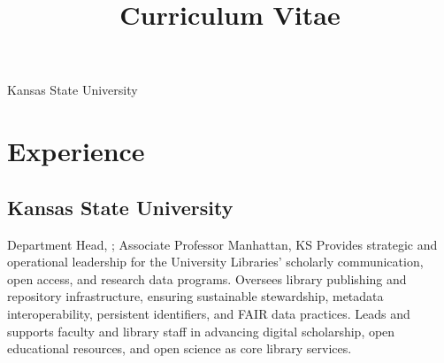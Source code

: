 


\title{Curriculum Vitae}
\address{University Library}{Kansas State University}








\portfoliotitle %



\section{Experience}

\subsection{Kansas State University}
  {Department Head, ; Associate Professor}
  {}
  {Manhattan, KS}{}%
  {
Provides strategic and operational leadership for the University Libraries’ scholarly communication, open access, and research data programs. Oversees library publishing and repository infrastructure, ensuring sustainable stewardship, metadata interoperability, persistent identifiers, and FAIR data practices. Leads and supports faculty and library staff in advancing digital scholarship, open educational resources, and open science as core library services.
  }

